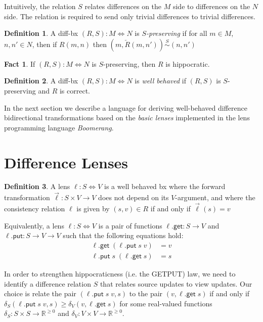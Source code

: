 \documentclass[acmsmall,review,anonymous]{acmart}\settopmatter{printfolios=true,printccs=false,printacmref=false}
\theoremstyle{definition}
\newtheorem{definition}{Definition}
\newtheorem{fact}{Fact}
\newcommand{\kw}[1]{\ensuremath{\mathsf{#1}}\xspace}
\newcommand{\get}{\ensuremath{\kw{get}}\xspace}
\newcommand{\pput}{\ensuremath{\kw{put}}\xspace}
\begin{document}
Intuitively, the relation $S$ relates differences on the $M$ side to differences on the $N$ side. The relation is required to send only trivial differences to trivial differences.
\begin{definition}
A diff-bx $(R,S) : M \Leftrightarrow N$ is {\em $S$-preserving} if for all $m \in M$, $n, n' \in N$, then if $R(m, n)$ then $(m, \overleftarrow{R}(m,n')) \stackrel{S}{\sim} (n, n')$
\end{definition}
\begin{fact}
If $(R,S) : M \Leftrightarrow N$ is $S$-preserving, then $R$ is hippocratic.
\end{fact}
\begin{definition}
A diff-bx $(R,S) : M \Leftrightarrow N$ is {\em well behaved} if $(R,S)$ is $S$-preserving and $R$ is correct.
\end{definition}
In the next section we describe a language for deriving well-behaved difference bidirectional transformations based on the {\em basic lenses} implemented in the lens programming language {\em Boomerang}.
\section{Difference Lenses}
\begin{definition}
A lens $\ell : S \Leftrightarrow V$ is a well behaved bx where the forward transformation $\overrightarrow{\ell} : S \times V \longrightarrow V$ does not depend on its $V$-argument, and where the consistency relation $\ell$ is given by $(s, v) \in R$ if and only if $\overrightarrow{\ell}(s) = v$

Equivalently, a lens $\ell : S \Leftrightarrow V$ is a pair of functions $\ell.\get : S \longrightarrow V$ and $\ell.\pput : S \longrightarrow V \longrightarrow V$ such that the following equations hold:
\begin{align*}
\ell.\get \; (\ell.\pput \; s \; v) &= v \tag{PUTGET}\\
\ell.\pput \; s \; (\ell.\get \; s) &= s \tag{GETPUT}
\end{align*}
\end{definition}
In order to strengthen hippocraticness (i.e. the GETPUT) law, we need to identify a difference relation $S$ that relates source updates to view updates. Our choice is relate the pair $(\ell.\pput \; s \; v, s)$ to the pair $(v, \ell.\get \; s)$ if and only if $\delta_S(\ell.\pput \; s \; v, s) \geq \delta_V(v, \ell.\get \; s)$ for some real-valued functions $\delta_S : S \times S \longrightarrow \mathbb{R}^{\geq 0}$ and $\delta_V : V \times V \longrightarrow \mathbb{R}^{\geq 0}$.
\end{document}
